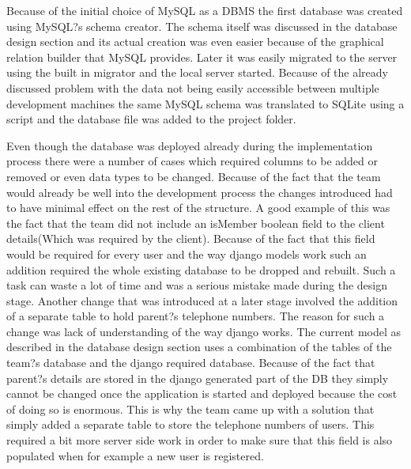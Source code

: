 \documentclass{l3proj}
\begin{document}
\par Because of the initial choice of MySQL as a DBMS the first database was created using MySQL?s schema creator. The schema itself was discussed in the database design section and its actual creation was even easier because of the graphical relation builder that MySQL provides. Later it was easily migrated to the server using the built in migrator and the local server started. Because of the already discussed problem with the data not being easily accessible between multiple development machines the same MySQL schema was translated to SQLite using a script and the database file was added to the project folder.\\
\par
Even though the database was deployed already during the implementation process there were a number of cases which required columns to be added or removed or even data types to be changed. Because of the fact that the team would already be well into the development process the changes introduced had to have minimal effect on the rest of the structure. A good example of this was the fact that the team did not include an isMember boolean field to the client details(Which was required by the client). Because of the fact that this field would be required for every user and the  way django models work such an addition required the whole existing database to be dropped and rebuilt. Such a task can waste a lot of time and was a serious mistake made during the design stage. Another change that was introduced at a later stage involved the addition of a separate table to hold parent?s telephone numbers. The reason for such a change was lack of understanding of the way django works. The current model as described in the database design section uses a combination of the tables of the team?s database and the django required database. Because of the fact that parent?s details are stored in the django generated part of the DB they simply cannot be changed once the application is started and deployed because the cost of doing so is enormous. This is why the team came up with a solution that simply added a separate table to store the telephone numbers of users. This required a bit more server side work in order to make sure that this field is also populated when for example a new user is registered. \\


\end{document}
